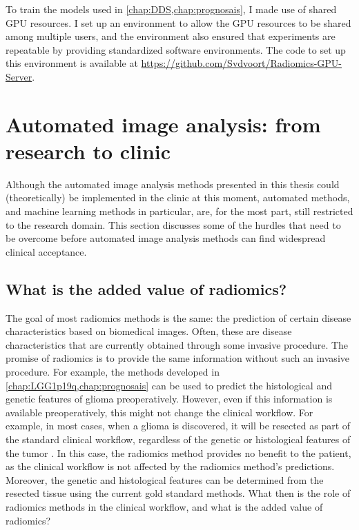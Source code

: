 To train the models used in \cref{chap:DDS,chap:prognosais}, I made use of shared GPU resources.
I set up an environment to allow the GPU resources to be shared among multiple users, and the environment also ensured that experiments are repeatable by providing standardized software environments.
The code to set up this environment is available at \url{https://github.com/Svdvoort/Radiomics-GPU-Server}.




\section{Automated image analysis: from research to clinic}\label{sec:discussion_clinical}

Although the automated image analysis methods presented in this thesis could (theoretically) be implemented in the clinic at this moment, automated methods, and machine learning methods in particular, are, for the most part, still restricted to the research domain.
This section discusses some of the hurdles that need to be overcome before automated image analysis methods can find widespread clinical acceptance.

\subsection{What is the added value of radiomics?}\label{subsec:discussion_added_value_radiomics}

The goal of most radiomics methods is the same: the prediction of certain disease characteristics based on biomedical images.
Often, these are disease characteristics that are currently obtained through some invasive procedure.
The promise of radiomics is to provide the same information without such an invasive procedure.
For example, the methods developed in \cref{chap:LGG1p19q,chap:prognosais} can be used to predict the histological and genetic features of glioma preoperatively.
However, even if this information is available preoperatively, this might not change the clinical workflow.
For example, in most cases, when a glioma is discovered, it will be resected as part of the standard clinical workflow, regardless of the genetic or histological features of the \gls{tumor} \autocite{welle2017EANO,stupp2014hggguidelines}.
In this case, the radiomics method provides no benefit to the patient, as the clinical workflow is not affected by the radiomics method's predictions.
Moreover, the genetic and histological features can be determined from the resected tissue using the current gold standard methods.
What then is the role of radiomics methods in the clinical workflow, and what is the added value of radiomics?

